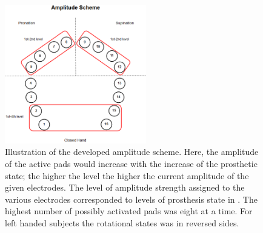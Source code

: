 \begin{figure}[H]                 
	\includegraphics[width=0.55\textwidth]{figures/El_array_amplitude}  
	\caption{Illustration of the developed amplitude scheme. Here, the amplitude of the active pads would increase with the increase of the prosthetic state; the higher the level the higher the current amplitude of the given electrodes. The level of amplitude strength assigned to the various electrodes corresponded to levels of prosthesis state in . The highest number of possibly activated pads was eight at a time. For left handed subjects the rotational states was in reversed sides.}
	\label{fig:amplitude} 
\end{figure}






